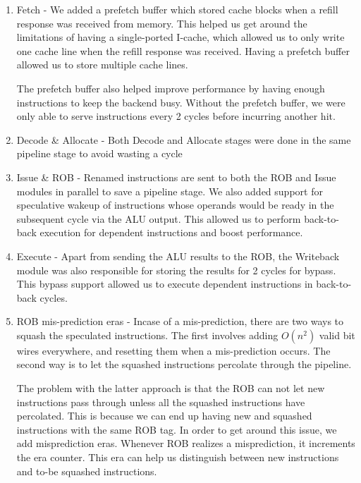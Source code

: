 \documentclass{article}
\begin{document}
\begin{enumerate}
	\item Fetch - We added a prefetch buffer which stored cache blocks when
	a refill response was received from memory. This helped us get around
	the limitations of having a single-ported I-cache, which allowed us to
	only write one cache line when the refill response was received. Having
	a prefetch buffer allowed us to store multiple cache lines. 
	
	The prefetch buffer also helped improve performance by having enough
	instructions to keep the backend busy. Without the prefetch buffer, we
	were only able to serve instructions every 2 cycles before incurring
	another hit.
	
	\item Decode \& Allocate - Both Decode and Allocate stages were done in
	the same pipeline stage to avoid wasting a cycle
	
	\item Issue \& ROB - Renamed instructions are sent to both the ROB and
	Issue modules in parallel to save a pipeline stage. We also added
	support for speculative wakeup of instructions whose operands would be
	ready in the subsequent cycle via the ALU output. This allowed us to
	perform back-to-back execution for dependent instructions and boost
	performance.
	
	\item Execute - Apart from sending the ALU results to the ROB, the
	Writeback module was also responsible for storing the results for 2
	cycles for bypass. This bypass support allowed us to execute dependent
	instructions in back-to-back cycles.
	
	\item ROB mis-prediction eras - Incase of a mis-prediction, there are
	two ways to squash the speculated instructions. The first involves
	adding $O(n^2)$ valid bit wires everywhere, and resetting them when a
	mis-prediction occurs. The second way is to let the squashed
	instructions percolate through the pipeline. 
	
	The problem with the latter approach is that the ROB can not let new
	instructions pass through unless all the squashed instructions have
	percolated. This is because we can end up having new and squashed
	instructions with the same ROB tag. In order to get around this issue,
	we add misprediction eras. Whenever ROB realizes a misprediction, it
	increments the era counter. This era can help us distinguish between
	new instructions and to-be squashed instructions. 
\end{enumerate}
\end{document}

